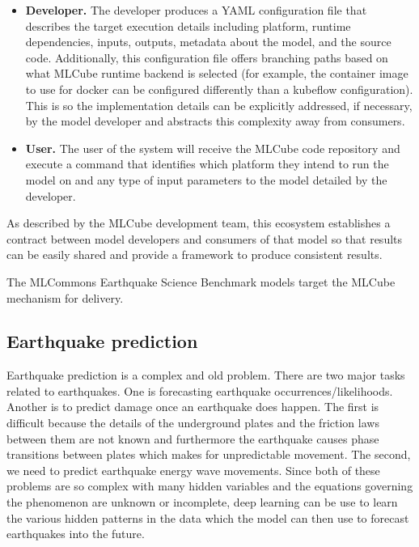 \documentclass[sigplan,screen]{format/acmart}
\providecommand{\mlcube}{MLCube}
\begin{document}
\begin{itemize}
    \item \textbf{Developer.}  The developer produces a YAML configuration file that describes the target execution details including platform, runtime dependencies, inputs, outputs, metadata about the model, and the source code.  Additionally, this configuration file offers branching paths based on what \mlcube{} runtime backend is selected (for example, the container image to use for docker can be configured differently than a kubeflow configuration).  This is so the implementation details can be explicitly addressed, if necessary, by the model developer and abstracts this complexity away from consumers.
    \item \textbf{User.}  The user of the system will receive the \mlcube{} code repository and execute a command that identifies which platform they intend to run the model on and any type of input parameters to the model detailed by the developer.
\end{itemize}

As described by the \mlcube{} development team, this ecosystem establishes a contract between model developers and consumers of that model so that results can be easily shared and provide a framework to produce consistent results.

The MLCommons Earthquake Science Benchmark models target the \mlcube{} mechanism for delivery.

\subsection{Earthquake prediction}

Earthquake prediction is a complex and old problem. There are two major tasks related to earthquakes. One is forecasting earthquake occurrences/likelihoods. Another is to predict damage once an earthquake does happen. The first is difficult because the details of the underground plates and the friction laws between them are not known and furthermore the earthquake causes phase transitions between plates which makes for unpredictable movement. The second, we need to predict earthquake energy wave movements. Since both of these problems are so complex with many hidden variables and the equations governing the phenomenon are unknown or incomplete, deep learning can be use to learn the various hidden patterns in the data which the model can then use to forecast earthquakes into the future. \cite{fox2021earthquake}
\end{document}
